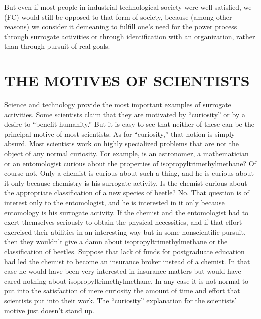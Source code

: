  But even if most people in industrial-technological society were well satisfied, we (FC) would still be opposed to that form of society, because (among other reasons) we consider it demeaning to fulfill one’s need for the power process through surrogate activities or through identification with an organization, rather than through pursuit of real goals.

\chapter{THE MOTIVES OF SCIENTISTS}

 Science and technology provide the most important examples of surrogate activities. Some scientists claim that they are motivated by “curiosity” or by a desire to “benefit humanity.” But it is easy to see that neither of these can be the principal motive of most scientists. As for “curiosity,” that notion is simply absurd. Most scientists work on highly specialized problems that are not the object of any normal curiosity. For example, is an astronomer, a mathematician or an entomologist curious about the properties of isopropyltrimethylmethane? Of course not. Only a chemist is curious about such a thing, and he is curious about it only because chemistry is his surrogate activity. Is the chemist curious about the appropriate classification of a new species of beetle? No. That question is of interest only to the entomologist, and he is interested in it only because entomology is his surrogate activity. If the chemist and the entomologist had to exert themselves seriously to obtain the physical necessities, and if that effort exercised their abilities in an interesting way but in some nonscientific pursuit, then they wouldn’t give a damn about isopropyltrimethylmethane or the classification of beetles. Suppose that lack of funds for postgraduate education had led the chemist to become an insurance broker instead of a chemist. In that case he would have been very interested in insurance matters but would have cared nothing about isopropyltrimethylmethane. In any case it is not normal to put into the satisfaction of mere curiosity the amount of time and effort that scientists put into their work. The “curiosity” explanation for the scientists’ motive just doesn’t stand up.
